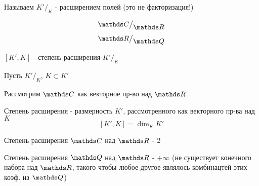 \documentclass[main.tex]{subfiles}
\begin{document}
\begin{Proof}
\begin{definition}
          Называем $K'\big/_{\displaystyle K}$ - расширением полей (это не факторизация!)
      \end{definition}

      \begin{Example}
          \[\CC\big/_{\displaystyle \R}\]
          \[\R\big/_{\displaystyle \Q}\]
      \end{Example}

      \begin{definition}
          $[K', K]$ - степень расширения $K'\big/_{\displaystyle K}$
      \end{definition}

      Пусть $K'\big/_{\displaystyle K}$, $K \subset K'$

      Рассмотрим $\CC$ как векторное пр-во над $\R$

      \begin{remark}
          Степень расширения - размерность $K'$, рассмотренного как векторного пр-ва над $K$
          \[[K',K] = \dim_K K'\]
      \end{remark}

      \begin{example}
          Степень расширения $\CC$ над $\R$ - 2

          Степень расширения $\Q$ над $\R$ - $+\infty$ (не существует конечного набора над $\R$, такого чтобы любое другое являлось комбинацтей этих коэф. из $\Q$)
      \end{example}
    \end{Proof}
\end{document}
